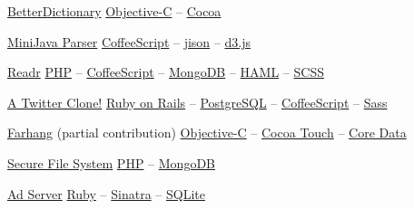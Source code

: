 \documentclass{tccv}
\begin{document}
{{\begin{oneline_projects}

\item{\href{http://pooriaazimi.github.io/BetterDictionary/}{BetterDictionary}}
	 {%
	 	\href{https://en.wikipedia.org/wiki/Objective-C}{Objective-C} -- %
		\href{https://en.wikipedia.org/wiki/Cocoa_(API)}{Cocoa}%
	 }	

\item{\href{https://github.com/pooriaazimi/Mini-Java}{MiniJava Parser}}
	 {%
		 \href{http://coffeescript.org}{CoffeeScript} -- %
		 \href{http://zaach.github.io/jison/}{jison} -- %
		 \href{http://d3js.org}{d3.js}%
	 }	

\item{\href{https://github.com/pooriaazimi/Readr}{Readr}}
	 {%
 		 \href{http://php.net}{PHP} -- %
		 \href{http://coffeescript.org}{CoffeeScript} -- %
		 \href{http://www.mongodb.org}{MongoDB} -- %
		 \href{http://haml.info/}{HAML} -- %
		 \href{http://sass-lang.com/}{SCSS}%
%
	 }

\item{\href{https://github.com/pooriaazimi/twitter}{A Twitter Clone!}}
	 {%
		 \href{http://rubyonrails.org}{Ruby on Rails} -- %
		 \href{http://www.postgresql.org}{PostgreSQL} -- %
		 \href{http://coffeescript.org}{CoffeeScript} -- %
		 \href{http://sass-lang.com}{Sass}%
	 }


\item{\href{http://www.turnedondigital.com/?portfolio=farhang-iphone-app}{Farhang} \large{\rm(partial contribution)}}
	 {%
	 	\href{https://en.wikipedia.org/wiki/Objective-C}{Objective-C} -- %
		\href{https://en.wikipedia.org/wiki/Cocoa_Touch}{Cocoa Touch} -- %
		\href{https://en.wikipedia.org/wiki/Core_Data}{Core Data}%
	 }

\item{\href{https://github.com/pooriaazimi/secure_file_system}{Secure File System}}
	 {%
		 \href{http://php.net}{PHP} -- %
		 \href{http://www.mongodb.org}{MongoDB}%
	 }

\item{\href{https://github.com/pooriaazimi/adserver}{Ad Server}}
	 {%
	 	\href{https://www.ruby-lang.org/en/}{Ruby} -- %
		\href{http://www.sinatrarb.com}{Sinatra} -- %
		\href{http://www.sqlite.org}{SQLite}%
	 }


\end{oneline_projects}





\vspace{-20pt}




}}
\end{document}
